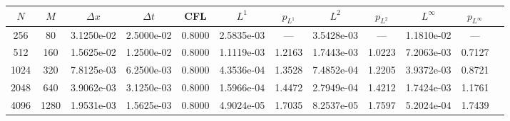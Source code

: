\begin{tabular}{cccccccccccc}
\toprule
$N$ & $M$ & $\Delta x$ & $\Delta t$ & CFL & $L^1$ & $p_{L^1}$ & $L^2$ & $p_{L^2}$ & $L^\infty$ & $p_{L^\infty}$ \\
\midrule
256 & 80 & 3.1250e-02 & 2.5000e-02 & 0.8000 & 2.5835e-03 & --- & 3.5428e-03 & --- & 1.1810e-02 & --- \\
512 & 160 & 1.5625e-02 & 1.2500e-02 & 0.8000 & 1.1119e-03 & 1.2163 & 1.7443e-03 & 1.0223 & 7.2063e-03 & 0.7127 \\
1024 & 320 & 7.8125e-03 & 6.2500e-03 & 0.8000 & 4.3536e-04 & 1.3528 & 7.4852e-04 & 1.2205 & 3.9372e-03 & 0.8721 \\
2048 & 640 & 3.9062e-03 & 3.1250e-03 & 0.8000 & 1.5966e-04 & 1.4472 & 2.7949e-04 & 1.4212 & 1.7424e-03 & 1.1761 \\
4096 & 1280 & 1.9531e-03 & 1.5625e-03 & 0.8000 & 4.9024e-05 & 1.7035 & 8.2537e-05 & 1.7597 & 5.2024e-04 & 1.7439 \\
\bottomrule
\end{tabular}